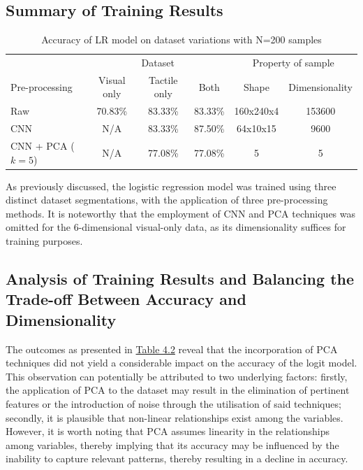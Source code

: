 \documentclass[11pt, a4paper]{report}
\begin{document}
\subsection{Summary of Training Results}\label{sec:4.5.1}
\label{sec:4.5.1}
\begin{table}[H]
    \centering
    \small
    \begin{tabular}{lccccc}
        \toprule
        & \multicolumn{3}{c}{Dataset} & \multicolumn{2}{c}{Property of sample} \\
        \cmidrule{2-4}\cmidrule{5-6}
        Pre-processing & Visual only & Tactile only & Both & Shape & Dimensionality \\
        \midrule
        Raw & 70.83\% & 83.33\% & 83.33\% & 160x240x4 & 153600 \\
        CNN & N/A & 83.33\% & 87.50\% & 64x10x15  & 9600 \\
        CNN + PCA ($k=5$) & N/A & 77.08\% & 77.08\% & 5 & 5\\
        \bottomrule
    \end{tabular}
    \caption{Accuracy of LR model on dataset variations with N=200 samples}
    \label{tbl:4.2}
\end{table}
As previously discussed, the logistic regression model was trained using three distinct dataset segmentations, with the application of three pre-processing methods. It is noteworthy that the employment of CNN and PCA techniques was omitted for the 6-dimensional visual-only data, as its dimensionality suffices for training purposes.


\subsection{Analysis of Training Results and Balancing the Trade-off Between Accuracy and Dimensionality}\label{sec:4.5.2}
The outcomes as presented in \hyperref[tbl:4.2]{Table 4.2} reveal that the incorporation of PCA techniques did not yield a considerable impact on the accuracy of the logit model. This observation can potentially be attributed to two underlying factors: firstly, the application of PCA to the dataset may result in the elimination of pertinent features or the introduction of noise through the utilisation of said techniques; secondly, it is plausible that non-linear relationships exist among the variables. However, it is worth noting that PCA assumes linearity in the relationships among variables, thereby implying that its accuracy may be influenced by the inability to capture relevant patterns, thereby resulting in a decline in accuracy.\\
\end{document}
